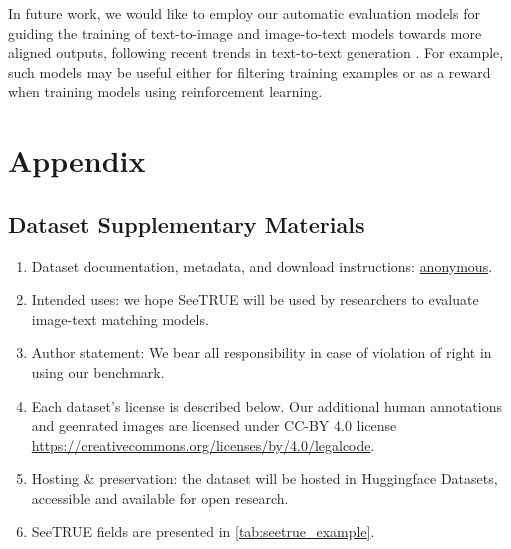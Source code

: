 \documentclass{article}
\newcommand{\datasetname}[0]{SeeTRUE\xspace}
\newcommand{\website}[0]{\url{anonymous}}
\begin{document}
In future work, we would like to employ our automatic evaluation models for guiding the training of text-to-image and image-to-text models towards more aligned outputs, following recent trends in text-to-text generation \citep{rashkin-etal-2021-increasing,aharoni2022mface}. For example, such models may be useful either for filtering training examples or as a reward when training models using reinforcement learning.




 



\vfill\null
\clearpage
\appendix
\section{Appendix}
\label{sec:appendix}

\subsection{Dataset Supplementary Materials}
\begin{enumerate}
  \item Dataset documentation, metadata, and download instructions: \website.
  \item Intended uses: we hope \datasetname will be used by researchers to evaluate image-text matching models. 
  \item Author statement: We bear all responsibility in case of violation of right in using our benchmark. 
  \item Each dataset's license is described below. Our additional human annotations and geenrated images are licensed under CC-BY 4.0 license \url{https://creativecommons.org/licenses/by/4.0/legalcode}.
  \item Hosting \& preservation: the dataset will be hosted in Huggingface Datasets, accessible and available for open research. 
  \item \datasetname fields are presented in \cref{tab:seetrue_example}.
\end{enumerate}
\end{document}

